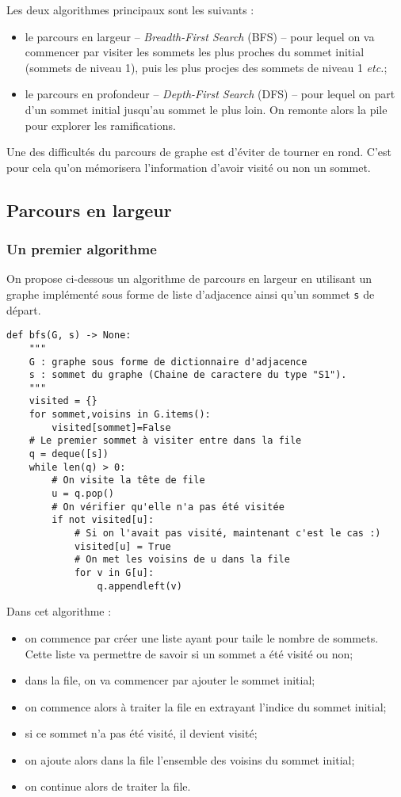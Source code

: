 Les deux algorithmes principaux sont les suivants :
\begin{itemize}
\item le parcours en largeur -- \textit{Breadth-First Search} (BFS) -- pour lequel on va commencer par visiter les sommets les plus proches du sommet initial (sommets de niveau 1), puis les plus procjes des sommets de niveau 1 \textit{etc.};
\item le parcours en profondeur  -- \textit{Depth-First Search} (DFS) -- pour lequel on part d'un sommet initial jusqu'au sommet le plus loin. On remonte alors la pile pour explorer les ramifications.
\end{itemize}

Une des difficultés du parcours de graphe est d'éviter de tourner en rond. C'est pour cela qu'on mémorisera l'information d'avoir visité ou non un sommet. 

\subsection{Parcours en largeur}

\subsubsection{Un premier algorithme}
On propose ci-dessous un algorithme de parcours en largeur en utilisant un graphe implémenté sous forme de liste d'adjacence ainsi qu'un sommet \texttt{s} de départ. 

\begin{lstlisting}
def bfs(G, s) -> None:
    """
    G : graphe sous forme de dictionnaire d'adjacence
    s : sommet du graphe (Chaine de caractere du type "S1").
    """
    visited = {}
    for sommet,voisins in G.items():
        visited[sommet]=False
    # Le premier sommet à visiter entre dans la file
    q = deque([s])
    while len(q) > 0:
        # On visite la tête de file
        u = q.pop()
        # On vérifier qu'elle n'a pas été visitée
        if not visited[u]:
            # Si on l'avait pas visité, maintenant c'est le cas :)
            visited[u] = True            
            # On met les voisins de u dans la file
            for v in G[u]:
                q.appendleft(v)
\end{lstlisting}

Dans cet algorithme : 
\begin{itemize}
\item on commence par créer une liste ayant pour taile le nombre de sommets. Cette liste va permettre de savoir si un sommet a été visité ou non;
\item dans la file, on va commencer par ajouter le sommet initial;
\item on commence alors à traiter la file en extrayant l'indice du sommet initial;
\item si ce sommet n'a pas été visité, il devient visité;
\item on ajoute alors dans la file l'ensemble des voisins du sommet initial;
\item on continue alors de traiter la file. 
\end{itemize}

